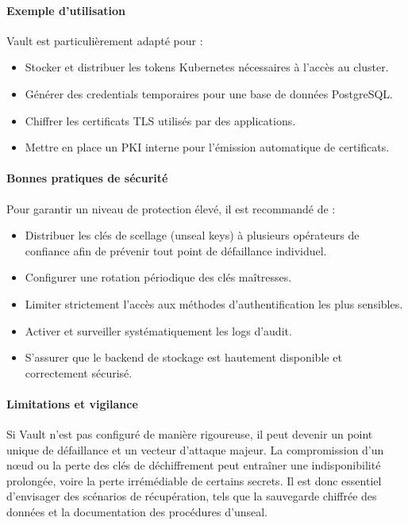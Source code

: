 \paragraph{Exemple d’utilisation}

Vault est particulièrement adapté pour :
\begin{itemize}
	\item Stocker et distribuer les tokens Kubernetes nécessaires à l’accès au cluster.
	\item Générer des credentials temporaires pour une base de données PostgreSQL.
	\item Chiffrer les certificats TLS utilisés par des applications.
	\item Mettre en place un PKI interne pour l’émission automatique de certificats.
\end{itemize}

\paragraph{Bonnes pratiques de sécurité}

Pour garantir un niveau de protection élevé, il est recommandé de :
\begin{itemize}
	\item Distribuer les clés de scellage (unseal keys) à plusieurs opérateurs de confiance afin de prévenir tout point de défaillance individuel.
	\item Configurer une rotation périodique des clés maîtresses.
	\item Limiter strictement l’accès aux méthodes d’authentification les plus sensibles.
	\item Activer et surveiller systématiquement les logs d’audit.
	\item S’assurer que le backend de stockage est hautement disponible et correctement sécurisé.
\end{itemize}

\paragraph{Limitations et vigilance}

Si Vault n’est pas configuré de manière rigoureuse, il peut devenir un point unique de défaillance et un vecteur d’attaque majeur. La compromission d’un nœud ou la perte des clés de déchiffrement peut entraîner une indisponibilité prolongée, voire la perte irrémédiable de certains secrets. Il est donc essentiel d’envisager des scénarios de récupération, tels que la sauvegarde chiffrée des données et la documentation des procédures d’unseal.
